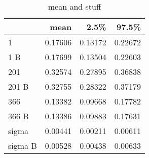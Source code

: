 \documentclass[
]{article}
\begin{document}
\begin{table}

\caption{\label{tab:1fburnFull}mean and stuff}
\centering
\begin{tabular}[t]{l|r|r|r}
\hline
  & mean & 2.5\% & 97.5\%\\
\hline
1 & 0.17606 & 0.13172 & 0.22672\\
\hline
1 B & 0.17699 & 0.13504 & 0.22603\\
\hline
201 & 0.32574 & 0.27895 & 0.36838\\
\hline
201 B & 0.32755 & 0.28322 & 0.37179\\
\hline
366 & 0.13382 & 0.09668 & 0.17782\\
\hline
366 B & 0.13386 & 0.09883 & 0.17631\\
\hline
sigma & 0.00441 & 0.00211 & 0.00611\\
\hline
sigma B & 0.00528 & 0.00438 & 0.00633\\
\hline
\end{tabular}
\end{table}
\end{document}
